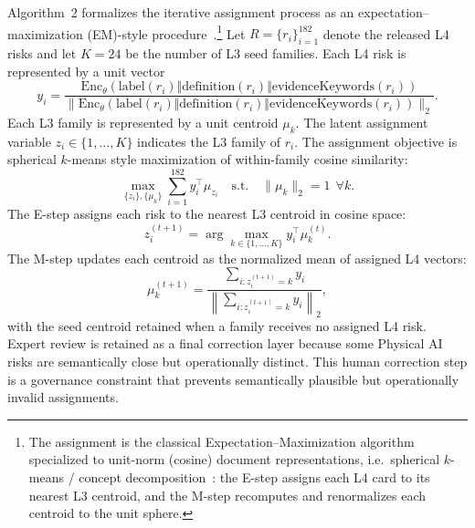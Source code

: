 \documentclass[11pt]{article}
\newcommand{\Enc}{\mathrm{Enc}_{\theta}}
\begin{document}
Algorithm~2 formalizes the iterative assignment process as an expectation--maximization (EM)-style procedure~\cite{dempster1977,dhillon2001}.\footnote{The assignment is the classical Expectation--Maximization algorithm~\cite{dempster1977} specialized to unit-norm (cosine) document representations, i.e.\ spherical \(k\)-means / concept decomposition~\cite{dhillon2001}: the E-step assigns each L4 card to its nearest L3 centroid, and the M-step recomputes and renormalizes each centroid to the unit sphere.} Let \(R=\{r_i\}_{i=1}^{182}\) denote the released L4 risks and let \(K=24\) be the number of L3 seed families. Each L4 risk is represented by a unit vector
\begin{equation}
  y_i=\frac{\Enc(\mathrm{label}(r_i)\Vert\mathrm{definition}(r_i)\Vert\mathrm{evidenceKeywords}(r_i))}{\|\Enc(\mathrm{label}(r_i)\Vert\mathrm{definition}(r_i)\Vert\mathrm{evidenceKeywords}(r_i))\|_2}.
\end{equation}
Each L3 family is represented by a unit centroid \(\mu_k\). The latent assignment variable \(z_i\in\{1,\ldots,K\}\) indicates the L3 family of \(r_i\). The assignment objective is spherical \(k\)-means style maximization of within-family cosine similarity:
\begin{equation}
  \max_{\{z_i\},\{\mu_k\}}
  \sum_{i=1}^{182} y_i^{\top}\mu_{z_i}
  \quad
  \mathrm{s.t.}\quad
  \|\mu_k\|_2=1\ \ \forall k.
\end{equation}
The E-step assigns each risk to the nearest L3 centroid in cosine space:
\begin{equation}
  z_i^{(t+1)}=
  \arg\max_{k\in\{1,\ldots,K\}}
  y_i^{\top}\mu_k^{(t)}.
\end{equation}
The M-step updates each centroid as the normalized mean of assigned L4 vectors:
\begin{equation}
  \mu_k^{(t+1)}
  =
  \frac{\sum_{i:z_i^{(t+1)}=k} y_i}
  {\left\|\sum_{i:z_i^{(t+1)}=k} y_i\right\|_2},
\end{equation}
with the seed centroid retained when a family receives no assigned L4 risk. Expert review is retained as a final correction layer because some Physical AI risks are semantically close but operationally distinct. This human correction step is a governance constraint that prevents semantically plausible but operationally invalid assignments.
\end{document}
